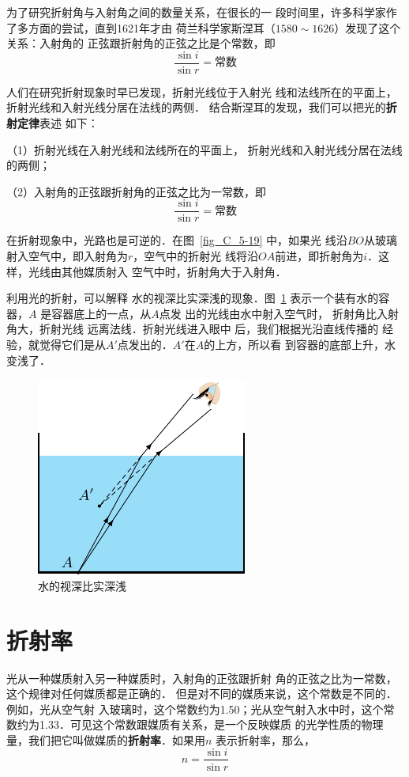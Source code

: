 为了研究折射角与入射角之间的数量关系，在很长的一
段时间里，许多科学家作了多方面的尝试，直到1621年才由
荷兰科学家斯涅耳（$1580 \sim 1626$）发现了这个关系：入射角的
正弦跟折射角的正弦之比是个常数，即
\[\frac{\sin i}{\sin r}=\text{常数}\]

人们在研究折射现象时早已发现，折射光线位于入射光
线和法线所在的平面上，折射光线和入射光线分居在法线的两侧．
结合斯涅耳的发现，我们可以把光的\textbf{折射定律}表述
如下：

（1）折射光线在入射光线和法线所在的平面上，
折射光线和入射光线分居在法线的两侧；

（2）入射角的正弦跟折射角的正弦之比为一常数，即
\[\frac{\sin i}{\sin r}=\text{常数}\]


在折射现象中，光路也是可逆的．在图~\ref{fig_C_5-19} 中，如果光
线沿$BO$从玻璃射入空气中，即入射角为$r$，空气中的折射光
线将沿$OA$前进，即折射角为$i$．这样，光线由其他媒质射入
空气中时，折射角大于入射角．

利用光的折射，可以解释
水的视深比实深浅的现象．图~\ref{fig_C_5-20} 表示一个装有水的容器，$A$
是容器底上的一点，从$A$点发
出的光线由水中射入空气时，
折射角比入射角大，折射光线
远离法线．折射光线进入眼中
后，我们根据光沿直线传播的
经验，就觉得它们是从$A'$点发出的．$A'$在$A$的上方，所以看
到容器的底部上升，水变浅了．
\begin{figure}[htbp]
    \centering
    \includegraphics{fig/C/5-20.pdf}
    \caption{水的视深比实深浅}\label{fig_C_5-20}
\end{figure}

\section{折射率}\label{sec_C_5-6}
光从一种媒质射入另一种媒质时，入射角的正弦跟折射
角的正弦之比为一常数，这个规律对任何媒质都是正确的．
但是对不同的媒质来说，这个常数是不同的．例如，光从空气射
入玻璃时，这个常数约为1.50；光从空气射入水中时，这个常
数约为1.33．可见这个常数跟媒质有关系，是一个反映媒质
的光学性质的物理量，我们把它叫做媒质的\textbf{折射率}．如果用$n$
表示折射率，那么，
\[n=\frac{\sin i}{\sin r}\]

